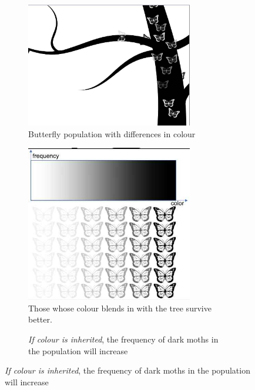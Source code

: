 \documentclass[]{article}
\begin{document}
\begin{figure}[H]
	\caption{Example of natural selection--light and dark butterflies}
	\begin{subfigure}[t]{0.3\textwidth}
		\caption{Butterfly population with differences in colour}\label{fig:SelectionMoths}
		\includegraphics[width=0.8\textwidth]{SelectionMoths}
	\end{subfigure}
	\;\;\;
	\begin{subfigure}[t]{0.3\textwidth}
		\caption{Those whose colour blends in with the tree survive better.}\label{fig:SelectionMoths1}
		\includegraphics[width=0.8\textwidth]{SelectionMoths1}
	\end{subfigure}
	\;\;\;
	\begin{subfigure}[t]{0.3\textwidth}
		\caption{ \emph{ If colour is inherited}, the frequency of dark moths in the population will increase}\label{fig:SelectionMoths2}

\end{subfigure}
\end{figure}
\end{document}
